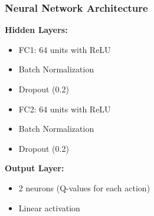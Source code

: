 \documentclass[a4paper, 12pt]{article}
\begin{document}
\subsubsection{Neural Network Architecture}
\begin{tcolorbox}[title=DQN Network Architecture]

    \item \textbf{Hidden Layers:}
    \begin{itemize}
        \item FC1: 64 units with ReLU
        \item Batch Normalization
        \item Dropout (0.2)
        \item FC2: 64 units with ReLU
        \item Batch Normalization
        \item Dropout (0.2)
    \end{itemize}

    \item \textbf{Output Layer:}
    \begin{itemize}
        \item 2 neurons (Q-values for each action)
        \item Linear activation
    \end{itemize}
\end{tcolorbox}
\end{document}
